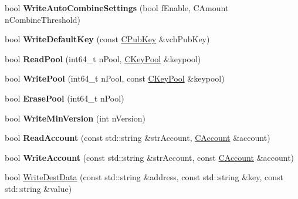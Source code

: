 \begin{DoxyCompactItemize}
\item 
\mbox{\label{class_c_wallet_d_b_a3acb1ee255226519bc613e2c1e572e72}} 
bool {\bfseries Write\+Auto\+Combine\+Settings} (bool f\+Enable, C\+Amount n\+Combine\+Threshold)
\item 
\mbox{\label{class_c_wallet_d_b_a1d925af18104900bddd19c968a0402b5}} 
bool {\bfseries Write\+Default\+Key} (const \mbox{\hyperlink{class_c_pub_key}{C\+Pub\+Key}} \&vch\+Pub\+Key)
\item 
\mbox{\label{class_c_wallet_d_b_a6a03927cf247314ccd9b285139de0bd1}} 
bool {\bfseries Read\+Pool} (int64\+\_\+t n\+Pool, \mbox{\hyperlink{class_c_key_pool}{C\+Key\+Pool}} \&keypool)
\item 
\mbox{\label{class_c_wallet_d_b_ad43630ad28a68c3e8b1a633f09aa0964}} 
bool {\bfseries Write\+Pool} (int64\+\_\+t n\+Pool, const \mbox{\hyperlink{class_c_key_pool}{C\+Key\+Pool}} \&keypool)
\item 
\mbox{\label{class_c_wallet_d_b_ac78d839fbda5164c4134ab67911139ca}} 
bool {\bfseries Erase\+Pool} (int64\+\_\+t n\+Pool)
\item 
\mbox{\label{class_c_wallet_d_b_ab008b6c6e09a60a988cac6e1a9e11886}} 
bool {\bfseries Write\+Min\+Version} (int n\+Version)
\item 
\mbox{\label{class_c_wallet_d_b_afa8d9d374072629b360adb49b9bdd584}} 
bool {\bfseries Read\+Account} (const std\+::string \&str\+Account, \mbox{\hyperlink{class_c_account}{C\+Account}} \&account)
\item 
\mbox{\label{class_c_wallet_d_b_afef640a4990f74fd5af7178c99415cf3}} 
bool {\bfseries Write\+Account} (const std\+::string \&str\+Account, const \mbox{\hyperlink{class_c_account}{C\+Account}} \&account)
\item 
\mbox{\label{class_c_wallet_d_b_af0de4949373dc3f0063db673fd8b24aa}} 
bool \mbox{\hyperlink{class_c_wallet_d_b_af0de4949373dc3f0063db673fd8b24aa}{Write\+Dest\+Data}} (const std\+::string \&address, const std\+::string \&key, const std\+::string \&value)

\end{DoxyCompactItemize}
